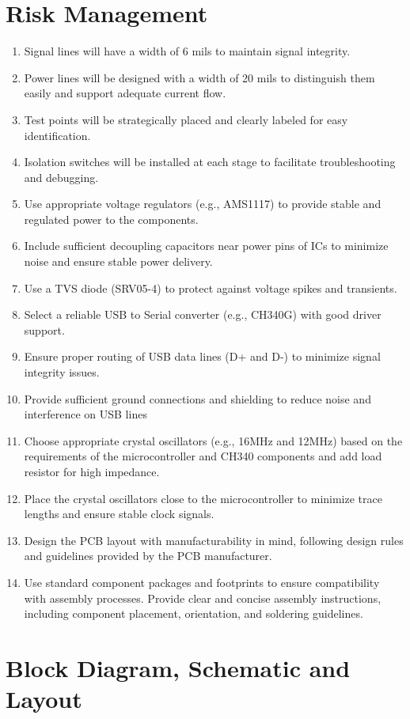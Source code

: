 \documentclass[a4paper,11pt]{article}%
\begin{document}
\section{Risk Management}
\begin{enumerate}
	\item Signal lines will have a width of 6 mils to maintain signal integrity.
	\item Power lines will be designed with a width of 20 mils to distinguish them easily and support adequate current flow.
	\item Test points will be strategically placed and clearly labeled for easy identification.
	\item Isolation switches will be installed at each stage to facilitate troubleshooting and debugging.
	\item Use appropriate voltage regulators (e.g., AMS1117) to provide stable and regulated power to the components.
	\item Include sufficient decoupling capacitors near power pins of ICs to minimize noise and ensure stable power delivery.
	\item Use a TVS diode (SRV05-4) to protect against voltage spikes and transients.
	\item Select a reliable USB to Serial converter (e.g., CH340G) with good driver support.
	\item Ensure proper routing of USB data lines (D+ and D-) to minimize signal integrity issues.
	\item Provide sufficient ground connections and shielding to reduce noise and interference on USB lines
	\item Choose appropriate crystal oscillators (e.g., 16MHz and 12MHz) based on the requirements of the microcontroller and CH340 components and add load resistor for high impedance.
	\item Place the crystal oscillators close to the microcontroller to minimize trace lengths and ensure stable clock signals.
	\item Design the PCB layout with manufacturability in mind, following design rules and guidelines provided by the PCB manufacturer.
	\item Use standard component packages and footprints to ensure compatibility with assembly processes.
	      Provide clear and concise assembly instructions, including component placement, orientation, and soldering guidelines.
\end{enumerate}


\section{Block Diagram, Schematic and Layout}
\end{document}
